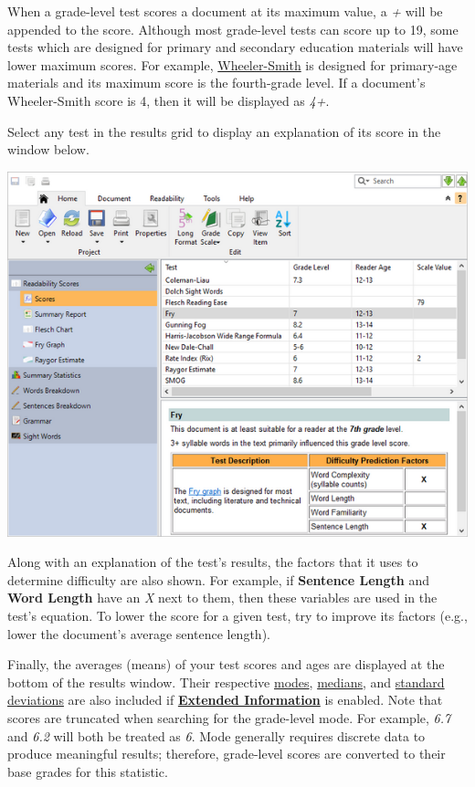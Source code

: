 \documentclass[
]{book}
\theoremstyle{definition}
\theoremstyle{definition}
\theoremstyle{definition}
\theoremstyle{definition}
\theoremstyle{remark}
\begin{document}
When a grade-level test scores a document at its maximum value, a \emph{+} will be appended to the score. Although most grade-level tests can score up to 19, some tests which are designed for primary and secondary education materials will have lower maximum scores. For example, \protect\hyperlink{wheeler-smith}{Wheeler-Smith} is designed for primary-age materials and its maximum score is the fourth-grade level. If a document's Wheeler-Smith score is 4, then it will be displayed as \emph{4+}.

Select any test in the results grid to display an explanation of its score in the window below.

\includegraphics{Images/scores.png}

Along with an explanation of the test's results, the factors that it uses to determine difficulty are also shown. For example, if \textbf{Sentence Length} and \textbf{Word Length} have an \emph{X} next to them, then these variables are used in the test's equation. To lower the score for a given test, try to improve its factors (e.g., lower the document's average sentence length).

Finally, the averages (means) of your test scores and ages are displayed at the bottom of the results window. Their respective \protect\hyperlink{stat-terms}{modes}, \protect\hyperlink{stat-terms}{medians}, and \protect\hyperlink{stat-terms}{standard deviations} are also included if \protect\hyperlink{options-summary-report}{\textbf{Extended Information}} is enabled. Note that scores are truncated when searching for the grade-level mode. For example, \emph{6.7} and \emph{6.2} will both be treated as \emph{6}. Mode generally requires discrete data to produce meaningful results; therefore, grade-level scores are converted to their base grades for this statistic.
\end{document}
